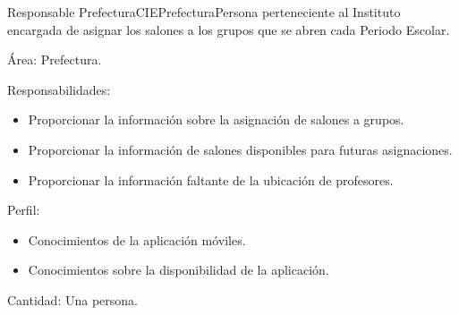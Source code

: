 \begin{actor}{Responsable Prefectura}{CIEPrefectura}{Persona perteneciente al Instituto encargada de asignar los salones a los grupos que se abren cada Periodo Escolar.}
	
	\item[Área:] Prefectura.
	\item[Responsabilidades:] \hspace{1pt}
	
	\begin{itemize}
		
		\item Proporcionar la información sobre la asignación de salones a grupos.
		\item Proporcionar la información de salones disponibles para futuras asignaciones.
		\item Proporcionar la información faltante de la ubicación de profesores.
		
	\end{itemize}
	
	\item[Perfil:] \hspace{1pt}
	
	\begin{itemize}
		
		\item Conocimientos de la aplicación móviles.
		\item Conocimientos sobre la disponibilidad de la aplicación.	
	\end{itemize}
	
	\item[Cantidad:] Una persona.
	
\end{actor}

